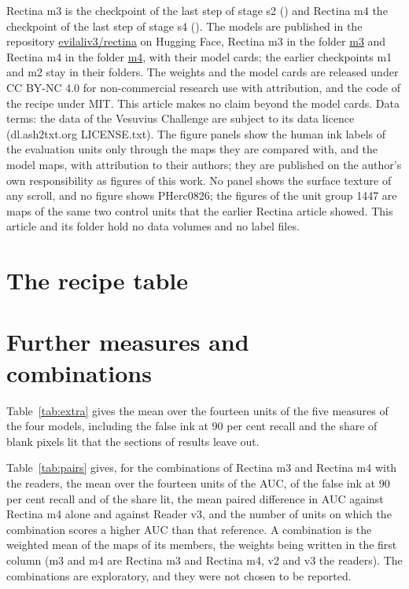 Rectina m3 is the checkpoint of the last step of stage s2 (\CkptThree{}) and Rectina m4 the checkpoint of the last step of stage s4 (\CkptFour{}). The models are published in the repository \href{https://huggingface.co/evilaliv3/rectina}{evilaliv3/rectina} on Hugging Face, Rectina m3 in the folder \href{https://huggingface.co/evilaliv3/rectina/tree/main/m3}{m3} and Rectina m4 in the folder \href{https://huggingface.co/evilaliv3/rectina/tree/main/m4}{m4}, with their model cards; the earlier checkpoints m1 and m2 stay in their folders. The weights and the model cards
are released under CC BY-NC 4.0 for non-commercial research use with attribution, and the code of the recipe under
MIT. This article makes no claim beyond the model cards. Data terms: the data of the Vesuvius Challenge are subject to its data licence (dl.ash2txt.org LICENSE.txt). The figure panels show the human ink labels of the evaluation units only through the maps they are compared with, and the model maps, with attribution to their authors; they are published on the author's own responsibility as figures of this work. No panel shows the surface texture of any scroll, and no figure shows PHerc0826; the figures of the unit group 1447 are maps of the same two control units that the earlier Rectina article showed. This article and its folder hold no data volumes and no label files.

\appendices

\section{The recipe table}



\section{Further measures and combinations}

Table~\ref{tab:extra} gives the mean over the fourteen units of the five measures of the four models, including the false ink at 90 per cent recall and the share of blank pixels lit that the sections of results leave out.

\begin{table}[!t]
\caption{Mean over the fourteen units of five measures of Reader v2, Reader v3, Rectina m3 and Rectina m4.}\label{tab:extra}
\centering

\end{table}

Table~\ref{tab:pairs} gives, for the combinations of Rectina m3 and Rectina m4 with the readers, the mean over the fourteen units of the AUC, of the false ink at 90 per cent recall and of the share lit, the mean paired difference in AUC against Rectina m4 alone and against Reader v3, and the number of units on which the combination scores a higher AUC than that reference. A combination is the weighted mean of the maps of its members, the weights being written in the first column (m3 and m4 are Rectina m3 and Rectina m4, v2 and v3 the readers). The combinations are exploratory, and they were not chosen to be reported.

